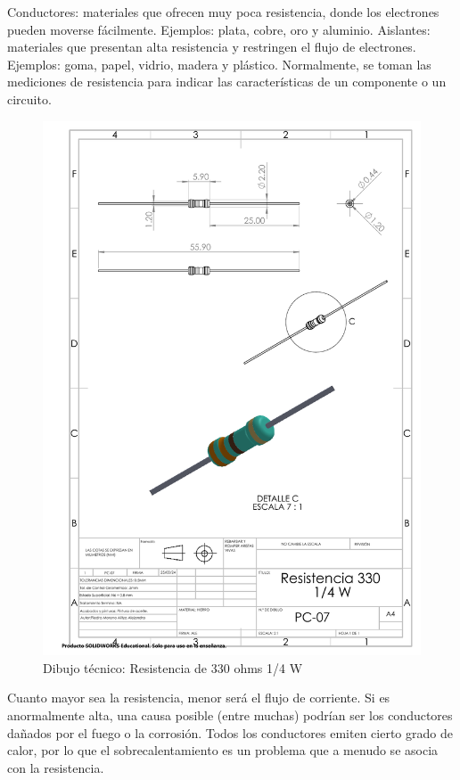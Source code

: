     Conductores: materiales que ofrecen muy poca resistencia, donde los electrones pueden moverse fácilmente. Ejemplos: plata, cobre, oro y aluminio.
    Aislantes: materiales que presentan alta resistencia y restringen el flujo de electrones. Ejemplos: goma, papel, vidrio, madera y plástico.
    Normalmente, se toman las mediciones de resistencia para indicar las características de un componente o un circuito.
    \begin{figure}[H]
        \centering
        \includegraphics[trim = {7mm 1mm 1mm 1mm},clip,scale=0.4]{22/Img/resistenciaDibujo.PDF}
        \caption{Dibujo técnico: Resistencia de 330 ohms 1/4 W}
        \label{fig:resistencia}
    \end{figure}
    Cuanto mayor sea la resistencia, menor será el flujo de corriente. Si es anormalmente alta, una causa posible (entre muchas) podrían ser los conductores dañados por el fuego o la corrosión. Todos los conductores emiten cierto grado de calor, por lo que el sobrecalentamiento es un problema que a menudo se asocia con la resistencia.
    
